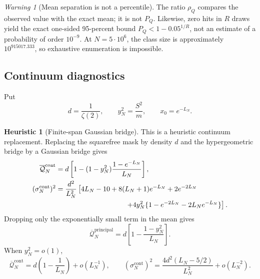 \documentclass[11pt,reqno]{amsart}
\numberwithin{equation}{section}
\theoremstyle{plain}
\theoremstyle{definition}
\newtheorem{heuristic}[theorem]{Heuristic}
\theoremstyle{remark}
\newtheorem{warning}[theorem]{Warning}
\newcommand{\QF}{\mathcal Q}
\begin{document}
\begin{warning}[Mean separation is not a percentile]
\label{warn:mean-not-percentile}
The ratio \(\rho_Q\) compares the observed value with the exact mean; it is
not \(P_Q\).  Likewise, zero hits in \(R\) draws yield the exact one-sided
95-percent bound \(P_Q<1-0.05^{1/R}\), not an estimate of a probability of
order \(10^{-9}\).  At \(N=5\cdot10^6\), the class size is approximately
\(10^{915017.333}\), so exhaustive enumeration is impossible.
\end{warning}

\subsection{Continuum diagnostics}
\label{subsec:continuum-diagnostics}

Put
\begin{equation}
d=\frac{1}{\zeta(2)},\qquad
y_N^2=\frac{S^2}{m},\qquad x_0=e^{-L_N}.
\label{eq:continuum-parameters}
\end{equation}

\begin{heuristic}[Finite-span Gaussian bridge]
\label{heur:finite-span-gaussian-bridge}
This is a heuristic continuum replacement.  Replacing the squarefree mask by
density \(d\) and the hypergeometric bridge by a Gaussian bridge gives
\begin{align}
\overline{\QF}_N^{\mathrm{cont}}
&=d\left[1-(1-y_N^2)\frac{1-e^{-L_N}}{L_N}\right],
\label{eq:continuum-mean}\\
(\sigma_N^{\mathrm{cont}})^2
&=\frac{d^2}{L_N^2}\left[
4L_N-10+8(L_N+1)e^{-L_N}+2e^{-2L_N}\right.
\notag\\
&\hspace{35mm}\left.
+4y_N^2\{1-e^{-2L_N}-2L_Ne^{-L_N}\}\right].
\label{eq:continuum-variance}
\end{align}
Dropping only the exponentially small term in the mean gives
\begin{equation}
\overline{\QF}_N^{\mathrm{principal}}
=d\left[1-\frac{1-y_N^2}{L_N}\right].
\label{eq:principal-continuum-mean}
\end{equation}
When \(y_N^2=o(1)\),
\begin{equation}
\overline{\QF}_N^{\mathrm{cont}}
=d\left(1-\frac1{L_N}\right)+o(L_N^{-1}),\qquad
(\sigma_N^{\mathrm{cont}})^2
=\frac{4d^2(L_N-5/2)}{L_N^2}+o(L_N^{-2}).
\label{eq:continuum-asymptotics}
\end{equation}
\end{heuristic}
\end{document}
